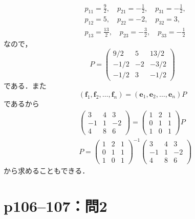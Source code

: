 \begin{tanswer}
  \begin{align*}
     & p_{11}=\frac{9}{2},\quad p_{21}=-\frac{1}{2},\quad p_{31}=-\frac{1}{2}, \\
     & p_{12}=5,\quad p_{22}=-2,\quad p_{32}=3,                                \\
     & p_{13}=\frac{13}{2},\quad p_{23}=-\frac{3}{2},\quad p_{33}=-\frac{1}{2}
  \end{align*}
  なので，
  \[
    P=
    \begin{pmatrix}
      9/2  & 5  & 13/2 \\
      -1/2 & -2 & -3/2 \\
      -1/2 & 3  & -1/2
    \end{pmatrix}
  \]
  である．また
  \begin{equation*}
    (\bm{f}_1,\bm{f}_2,\ldots ,\bm{f}_n)=(\bm{e}_1,\bm{e}_2,\ldots ,\bm{e}_n)P
  \end{equation*}
  であるから
  \begin{align*}
     &
    \begin{pmatrix}
      3  & 4 & 3  \\
      -1 & 1 & -2 \\
      4  & 8 & 6
    \end{pmatrix}
    =
    \begin{pmatrix}
      1 & 2 & 1 \\
      0 & 1 & 1 \\
      1 & 0 & 1
    \end{pmatrix}
    P     \\
     & P=
    \begin{pmatrix}
      1 & 2 & 1 \\
      0 & 1 & 1 \\
      1 & 0 & 1
    \end{pmatrix}
    ^{-1}
    \begin{pmatrix}
      3  & 4 & 3  \\
      -1 & 1 & -2 \\
      4  & 8 & 6
    \end{pmatrix}
  \end{align*}
  から求めることもできる．
\end{tanswer}



\section*{p106--107：問2}

